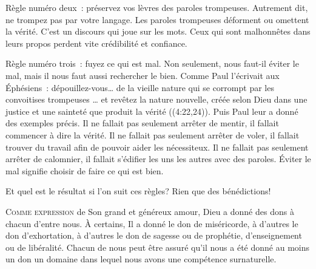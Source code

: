 Règle numéro deux~: préservez vos lèvres des paroles trompeuses.
 Autrement dit, ne trompez pas par votre langage. Les paroles trompeuses
 déforment ou omettent la vérité. C'est un discours qui joue sur les mots.
 Ceux qui sont malhonnêtes dans leurs propos perdent vite
 crédibilité et confiance.


Règle numéro trois~: fuyez ce qui est mal.
 Non seulement, nous faut-il éviter le mal, mais il nous faut aussi rechercher
 le bien. Comme Paul l'écrivait aux Éphésiens~: 
 \og dépouillez-vous\dots{} de la vieille nature qui se corrompt
 par les convoitises trompeuses 
 \dots{} et revêtez la nature nouvelle, créée selon Dieu dans une justice
 et une sainteté que produit la vérité \fg{} 
 ((4:22,24)).
 Puis Paul leur a donné des exemples précis.
 Il ne fallait pas seulement arrêter de mentir,
 il fallait commencer à dire la vérité. Il ne fallait pas seulement arrêter
 de voler, il fallait trouver du travail afin de pouvoir aider les nécessiteux.
 Il ne fallait pas seulement arrêter de calomnier, il fallait s'édifier
 les uns les autres avec des paroles. Éviter le mal signifie choisir
 de faire ce qui est bien.

Et quel est le résultat si l'on suit ces règles? Rien que des bénédictions!

\dvrule






\lettrine{C}{omme expression} de Son grand et généreux amour,
 Dieu a donné des dons à chacun d'entre nous.
 À certains, Il a donné le don de miséricorde, à d'autres le don d'exhortation,
 à d'autres le don de sagesse ou de prophétie, d'enseignement ou de libéralité.
 Chacun de nous peut être assuré qu'il nous a été donné au moins un don
 \ocadr un domaine dans lequel nous avons une compétence surnaturelle.

